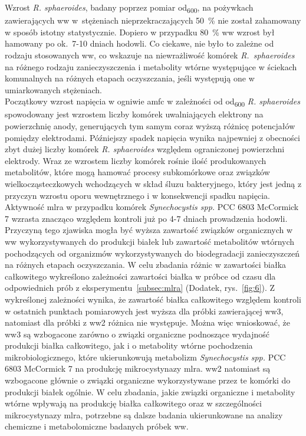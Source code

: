 Wzrost \textit{R. sphaeroides}, badany poprzez pomiar
\acrshort{od}\textsubscript{600}, na pożywkach zawierających
\acrshort{ww} w~stężeniach nieprzekraczających 50~\%
nie został zahamowany w sposób istotny statystycznie.
Dopiero w przypadku 80~\% \acrshort{ww} wzrost był hamowany
po ok.\ 7-10 dniach hodowli.
Co ciekawe, nie było to zależne od rodzaju stosowanych
\acrshort{ww}, co wskazuje na niewrażliwość komórek
\textit{R.~sphaeroides} na różnego rodzaju zanieczyszczenia
i metabolity wtórne występujące w ściekach komunalnych
na różnych etapach oczyszczania, jeśli występują one
w umiarkowanych stężeniach.\\

Początkowy wzrost napięcia w ogniwie \acrshort{amfc}
w zależności od \acrshort{od}\textsubscript{600}
\textit{R. sphaeroides} spowodowany jest wzrostem liczby
komórek uwalniających elektrony na powierzchnię anody,
generujących tym samym coraz wyższą różnicę potencjałów
pomiędzy elektrodami.
Późniejszy spadek napięcia wynika najpewniej z obecności
zbyt dużej liczby komórek \textit{R. sphaeroides}
względem ograniczonej powierzchni elektrody.
Wraz ze wzrostem liczby komórek rośnie ilość produkowanych
metabolitów, które mogą hamować procesy subkomórkowe oraz związków
wielkocząsteczkowych wchodzących w skład śluzu bakteryjnego,
który jest jedną z przyczyn wzrostu oporu wewnętrznego
i w konsekwencji spadku napięcia.\\

Aktywność \acrshort{mlra} w przypadku komórek
\textit{Synechocystis spp.} PCC 6803 McCormick 7
wzrasta znacząco względem kontroli już po 4-7 dniach
prowadzenia hodowli.
Przyczyną tego zjawiska mogła być wyższa zawartość
związków organicznych w \acrshort{ww} wykorzystywanych
do produkcji białek lub zawartość metabolitów
wtórnych pochodzących od organizmów wykorzystywanych
do biodegradacji zanieczyszczeń na różnych etapach oczyszczania.
W celu zbadania różnic w zawartości białka całkowitego
wykreślono zależności zawartości białka w próbce od czasu
dla odpowiednich prób z eksperymentu~\ref{subsec:mlra}
(Dodatek, rys.~\ref{fig:6}).
Z wykreślonej zależności wynika, że zawartość białka
całkowitego względem kontroli w ostatnich punktach pomiarowych
jest wyższa dla próbki zawierającej \acrshort{ww}3, natomiast
dla próbki z \acrshort{ww}2 różnica nie występuje.
Można więc wnioskować, że \acrshort{ww}3 są wzbogacone
zarówno o związki organiczne podnoszące wydajność
produkcji białka całkowitego, jak i o metabolity wtórne
pochodzenia mikrobiologicznego, które ukierunkowują metabolizm
\textit{Synechocystis spp.} PCC 6803 McCormick 7 na produkcję
mikrocystynazy \acrshort{mlra}. \acrshort{ww}2 natomiast
są wzbogacone głównie o związki organiczne wykorzystywane
przez te komórki do produkcji białek ogólnie.
W celu zbadania, jakie związki organiczne i metabolity
wtórne wpływają na produkcję białka całkowitego
oraz w szczególności mikrocystynazy \acrshort{mlra},
potrzebne są dalsze badania ukierunkowane na analizy
chemiczne i metabolomiczne badanych próbek \acrshort{ww}.